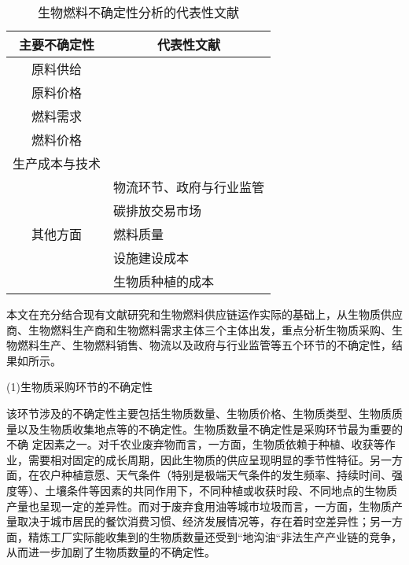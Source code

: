 \begin{table}[htbp]
	\centering
	\caption{生物燃料不确定性分析的代表性文献}\label{tbl:bibliography}
	\begin{tabular}{cl}
		\toprule
		主要不确定性 & \multicolumn{1}{c}{代表性文献}\\
		\midrule
		原料供给 & \cite{Awudu2012}\cite{Chen2012}\cite{Kim2011}\cite{Foo2013}\cite{Awudu2013}\cite{Shabani2014}\cite{Osmani2013,Li2014}\cite{Tong2014,Yeh2015,Tong2014a} \\
		原料价格 & \cite{Awudu2013}\cite{Giarola2012}\cite{Osmani2013}\\
		燃料需求 & \cite{Awudu2012}\cite{Kim2011}\cite{Awudu2013}\cite{Azadeh2014}\cite{Osmani2013}\cite{Tong2014,Yeh2015,Tong2014a}\\
		燃料价格 & \cite{Awudu2012}\cite{Chen2012}\cite{Kim2011}\cite{Zheng2012,Awudu2013,Azadeh2014,Giarola2012}\cite{Osmani2013}\cite{Li2014}\cite{Yeh2015}\\
		生产成本与技术 & \cite{Awudu2012}\cite{Kim2011}\cite{Li2014}\cite{Tong2014,Yeh2015} \\
		\multirow{5}{*}{其他方面} & 物流环节、政府与行业监管\cite{Awudu2012}\\
		&碳排放交易市场\cite{Giarola2012} \\
		&燃料质量\cite{Zheng2012} \\
		&设施建设成本\cite{Tong2014} \\
		&生物质种植的成本\cite{Balaman2014} \\
		\bottomrule
	\end{tabular}
\end{table}

本文在充分结合现有文献研究和生物燃料供应链运作实际的基础上，从生物质供应商、生物燃料生产商和生物燃料需求主体三个主体出发，重点分析生物质采购、生物燃料生产、生物燃料销售、物流以及政府与行业监管等五个环节的不确定性，结果如所示。

(1)生物质采购环节的不确定性

该环节涉及的不确定性主要包括生物质数量、生物质价格、生物质类型、生物质质量以及生物质收集地点等的不确定性。生物质数量不确定性是采购环节最为重要的不确 定因素之一。对千农业废弃物而言，一方面，生物质依赖于种植、收获等作业，需要相对固定的成长周期，因此生物质的供应呈现明显的季节性特征。另一方面，在农户种植意愿、天气条件（特别是极端天气条件的发生频率、持续时间、强度等）、土壤条件等因素的共同作用下，不同种植或收获时段、不同地点的生物质产量也呈现一定的差异性\cite{Langholtz2014}。而对于废弃食用油等城市垃圾而言，一方面，生物质产量取决于城市居民的餐饮消费习惯、经济发展情况等，存在着时空差异性；另一方面，精炼工厂实际能收集到的生物质数量还受到“地沟油“非法生产产业链的竞争，从而进一步加剧了生物质数量的不确定性。

